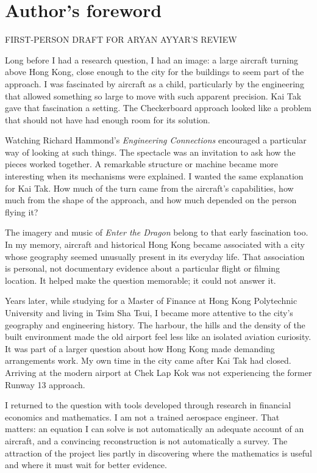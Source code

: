 \section*{Author's foreword}
{\small\sffamily\color{copper}FIRST-PERSON DRAFT FOR ARYAN AYYAR'S REVIEW}\par\medskip
Long before I had a research question, I had an image: a large aircraft turning above Hong Kong, close enough to the city for the buildings to seem part of the approach. I was fascinated by aircraft as a child, particularly by the engineering that allowed something so large to move with such apparent precision. Kai Tak gave that fascination a setting. The Checkerboard approach looked like a problem that should not have had enough room for its solution.

Watching Richard Hammond's \emph{Engineering Connections} encouraged a particular way of looking at such things. The spectacle was an invitation to ask how the pieces worked together. A remarkable structure or machine became more interesting when its mechanisms were explained. I wanted the same explanation for Kai Tak. How much of the turn came from the aircraft's capabilities, how much from the shape of the approach, and how much depended on the person flying it?

The imagery and music of \emph{Enter the Dragon} belong to that early fascination too. In my memory, aircraft and historical Hong Kong became associated with a city whose geography seemed unusually present in its everyday life. That association is personal, not documentary evidence about a particular flight or filming location. It helped make the question memorable; it could not answer it.

Years later, while studying for a Master of Finance at Hong Kong Polytechnic University and living in Tsim Sha Tsui, I became more attentive to the city's geography and engineering history. The harbour, the hills and the density of the built environment made the old airport feel less like an isolated aviation curiosity. It was part of a larger question about how Hong Kong made demanding arrangements work. My own time in the city came after Kai Tak had closed. Arriving at the modern airport at Chek Lap Kok was not experiencing the former Runway 13 approach.

I returned to the question with tools developed through research in financial economics and mathematics. I am not a trained aerospace engineer. That matters: an equation I can solve is not automatically an adequate account of an aircraft, and a convincing reconstruction is not automatically a survey. The attraction of the project lies partly in discovering where the mathematics is useful and where it must wait for better evidence.


